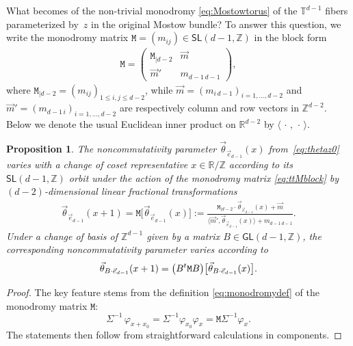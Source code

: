 \documentclass[11pt]{article}
\numberwithin{equation}{section}
\numberwithin{equation}{section}
\newcommand{\Z}{\zed}
\newcommand{\sfGL}{\mathsf{GL}}
\newcommand{\sfSL}{\mathsf{SL}}
\newcommand{\ttM}{\mathtt{M}}
\newcommand{\R}{\real}
\newcommand{\zed}{{\mathbb Z}} %
\newcommand{\real}{{\mathbb R}} %
\newcommand{\torus}{{\mathbb T}} %
\newtheorem{Proposition}[Theorem]{Proposition}
 { \theoremstyle{definition}
\newtheorem{Definition}[Theorem]{Definition}
\newtheorem{Note}[Theorem]{Note}
\newtheorem{Example}[Theorem]{Example}
\newtheorem{Remark}[Theorem]{Remark} }
\begin{document}
What becomes of the non-trivial monodromy \eqref{eq:Mostowtorus} of
the $\torus^{d-1}$ fibers parameterized by~$z$ in the original Mostow
bundle? To answer this question, we write the monodromy matrix
$\ttM=(m_{ij})\in\sfSL(d-1,\Z)$ in the block form
\begin{gather}\label{eq:ttMblock}
\ttM = \left(\begin{matrix} \ttM_{|d-2} & \vec m \\
\vec m' & m_{d-1 \, d-1}
\end{matrix}\right) ,
\end{gather}
where $\ttM_{|d-2}=(m_{ij})_{1\leq i,j\leq d-2}$, while $\vec m=(m_{i \,
 d-1})_{i=1,\dots,d-2}$ and $\vec m' = (m_{d-1 \,
 i})_{i=1,\dots,d-2}$ are respectively column and row vectors in $\Z^{d-2}$. Below
we denote the usual Euclidean inner product on $\R^{d-2}$ by
$\langle\,\cdot\,,\,\cdot\,\rangle$.
\begin{Proposition}\label{prop:monodromyprop}
The noncommutativity parameter
$\vec\theta_{\vec e_{d-1}}(x)$ from~\eqref{eq:thetaz0} varies with a
change of coset representative $x\in\R/\Z$ according to its
$\sfSL(d-1,\Z)$ orbit under the action of the monodromy matrix
\eqref{eq:ttMblock} by $(d{-}2)$-dimensional linear fractional transformations
\begin{gather}\label{eq:thetaMoritagen}
\vec\theta_{\vec e_{d-1}}(x+1) = \ttM\big[\vec\theta_{\vec
 e_{d-1}}(x)\big] :=
\frac{\ttM_{|d-2}\cdot\vec\theta_{\vec e_{d-1}}(x) + \vec m}
{\big\langle \vec m',\vec\theta_{\vec e_{d-1}}(x)\big\rangle + m_{d-1 \,
 d-1}} .
\end{gather}
Under a change of basis of $\Z^{d-1}$ given
by a matrix $B\in\sfGL(d-1,\Z)$, the corresponding noncommutativity
parameter varies according to
\[
\vec\theta_{B\cdot\vec e_{d-1}}(x+1) = \big(B^{\rm
 t} \ttM B\big)\big[\vec\theta_{B\cdot\vec e_{d-1}}(x)\big] .
\]
\end{Proposition}
\begin{proof}
The key feature stems from the definition \eqref{eq:monodromydef} of the monodromy matrix
$\ttM$:
\[
\Sigma^{-1}\,\varphi_{x+x_0} = \Sigma^{-1} \varphi_{x_0} \varphi_x =
\ttM \Sigma^{-1} \varphi_x .
\]
The statements then follow from straightforward calculations in components.
\end{proof}
\end{document}
